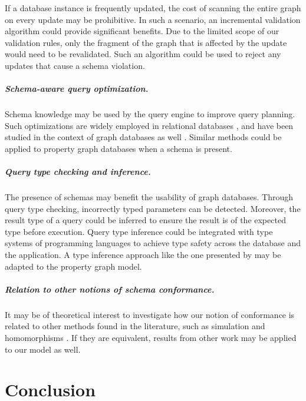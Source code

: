\documentclass{report}
\theoremstyle{definition}
\begin{document}
If a database instance is frequently updated, the cost of scanning the entire graph on every update may be prohibitive. In such a scenario, an incremental validation algorithm could provide significant benefits. Due to the limited scope of our validation rules, only the fragment of the graph that is affected by the update would need to be revalidated. Such an algorithm could be used to reject any updates that cause a schema violation.

\paragraph{Schema-aware query optimization.} Schema knowledge may be used by the query engine to improve query planning. Such optimizations are widely employed in relational databases \citep{chakravarthy1990logic, meier2013semantic,silberschatz2011database}, and have been studied in the context of graph databases as well \citep{buneman1997adding,popa1999equational}. Similar methods could be applied to property graph databases when a schema is present.

\paragraph{Query type checking and inference.} The presence of schemas may benefit the usability of graph databases. Through query type checking, incorrectly typed parameters can be detected. Moreover, the result type of a query could be inferred to ensure the result is of the expected type before execution. Query type inference could be integrated with type systems of programming languages to achieve type safety across the database and the application. A type inference approach like the one presented by \citet{colazzo2015typing} may be adapted to the property graph model.

\paragraph{Relation to other notions of schema conformance.} It may be of theoretical interest to investigate how our notion of conformance is related to other methods found in the literature, such as simulation \citep{buneman1997adding} and homomorphisms \citep{bonifati2019schema}. If they are equivalent, results from other work may be applied to our model as well.

\chapter{Conclusion}
\label{ch:conclusion}
\end{document}

